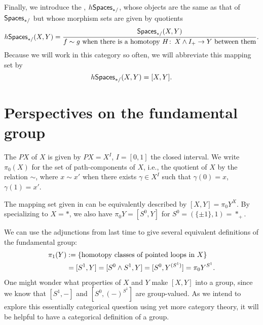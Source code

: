\begin{definition}\label{HoCatDefn}%
Finally, we introduce the , $h\mathsf{Spaces}_{*/}$, whose objects are the same as that of $\mathsf{Spaces}_{*/}$ but whose morphism sets are given by quotients \[h\mathsf{Spaces}_{*/}(X, Y) = \frac{\mathsf{Spaces}_{*/}(X, Y)}{\text{$f \sim g$ when there is a homotopy $H \colon\thinspace X \wedge I_+ \to Y$ between them}}.\]
Because we will work in this category so often, we will abbreviate this mapping set by \[h\mathsf{Spaces}_{*/}(X, Y) = [X, Y].\]
\end{definition}




\section{Perspectives on the fundamental group}

\begin{definition}
The  $PX$ of $X$ is given by $PX = X^I$, $I = [0, 1]$ the closed interval.
We write $\pi_0(X)$ for the set of path-components of $X$, i.e., the quotient of $X$ by the relation $\sim$, where $x \sim x'$ when there exists $\gamma \in X^I$ such that $\gamma(0) = x$, $\gamma(1) = x'$.
\end{definition}

\begin{remark}
The mapping set given in  can be equivalently described by $[X, Y] = \pi_0 Y^X$.
By specializing to $X = *$, we also have $\pi_0 Y = [S^0, Y]$ for $S^0 = (\{\pm 1\}, 1) = *_+$.
\end{remark}

We can use the adjunctions from last time to give several equivalent definitions of the fundamental group:
\begin{align*}
\pi_1(Y) & := \{\text{homotopy classes of pointed loops in $X$}\} \\
& = [S^1, Y] = [S^0 \wedge S^1, Y] = [S^0, Y^{(S^1)}] = \pi_0 Y^{S^1}.
\end{align*}
One might wonder what properties of $X$ and $Y$ make $[X, Y]$ into a group, since we know that $[S^1, -]$ and $[S^0, (-)^{S^1}]$ are group-valued.
As we intend to explore this essentially categorical question using yet more category theory, it will be helpful to have a categorical definition of a group.


